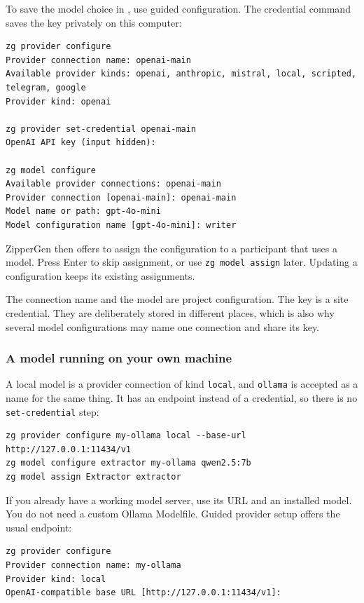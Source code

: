 \documentclass[11pt,a4paper]{article}
\begin{document}
To save the model choice in , use guided configuration.
The credential command saves the key privately on this computer:

\begin{lstlisting}[style=shell]
zg provider configure
Provider connection name: openai-main
Available provider kinds: openai, anthropic, mistral, local, scripted, telegram, google
Provider kind: openai

zg provider set-credential openai-main
OpenAI API key (input hidden):

zg model configure
Available provider connections: openai-main
Provider connection [openai-main]: openai-main
Model name or path: gpt-4o-mini
Model configuration name [gpt-4o-mini]: writer
\end{lstlisting}

ZipperGen then offers to assign the configuration to a participant that uses a
model. Press Enter to skip assignment, or use \texttt{zg model assign} later.
Updating a configuration keeps its existing assignments.

The connection name and the model are project configuration. The key is a site
credential. They are deliberately stored in different places, which is also why
several model configurations may name one connection and share its key.

\subsubsection{A model running on your own machine}

A local model is a provider connection of kind \texttt{local}, and
\texttt{ollama} is accepted as a name for the same thing. It has an endpoint
instead of a credential, so there is no \texttt{set-credential} step:

\begin{lstlisting}[style=shell]
zg provider configure my-ollama local --base-url http://127.0.0.1:11434/v1
zg model configure extractor my-ollama qwen2.5:7b
zg model assign Extractor extractor
\end{lstlisting}

If you already have a working model server, use its URL and an installed model.
You do not need a custom Ollama Modelfile. Guided provider setup offers the
usual endpoint:

\begin{lstlisting}[style=shell]
zg provider configure
Provider connection name: my-ollama
Provider kind: local
OpenAI-compatible base URL [http://127.0.0.1:11434/v1]:
\end{lstlisting}
\end{document}
